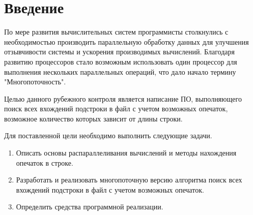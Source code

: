 \chapter*{Введение}

По мере развития вычислительных систем программисты столкнулись с необходимостью производить параллельную обработку данных для улучшения отзывчивости системы и ускорения производимых вычислений.
Благодаря развитию процессоров стало возможным использовать один процессор для выполнения нескольких параллельных операций, что дало начало термину "Многопоточность".

Целью данного рубежного контроля является написание ПО, выполняющего поиск всех вхождений подстроки в файл с учетом возможных опечаток, возможное количество которых зависит от длины строки.

Для поставленной цели необходимо выполнить следующие задачи.
\begin{enumerate}
	\item Описать основы распараллеливания вычислений и методы нахождения опечаток в строке.
	\item Разработать и реализовать многопоточную версию алгоритма поиск всех вхождений подстроки в файл с учетом возможных опечаток.
	\item Определить средства программной реализации.
\end{enumerate}
